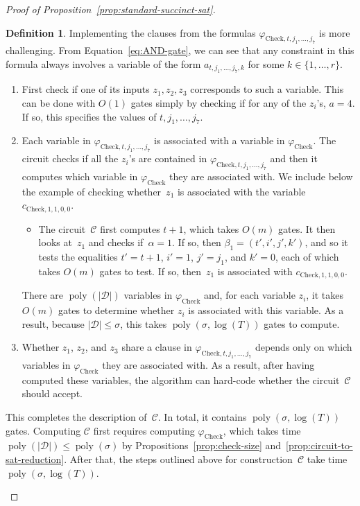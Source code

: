 \documentclass[11pt]{article}
\theoremstyle{definition}
\newtheorem{definition}[theorem]{Definition}
\DeclareMathOperator{\poly}{poly}
\newcommand{\decider}{\mathcal{D}}
\newcommand{\circuit}{\mathcal{C}}
\begin{document}
\begin{proof}[Proof of Proposition~\ref{prop:standard-succinct-sat}]
\begin{definition}
  Implementing the clauses from the formulas $\varphi_{\mathrm{Check}, t, j_1,
    \ldots, j_7}$ is more challenging.
  From Equation~\eqref{eq:AND-gate}, we can see that any constraint in this
  formula always involves a variable of the form $a_{t, j_1, \ldots, j_7, k}$
  for some $k \in \{1, \ldots, r\}$.
  \begin{enumerate}
  \item First check if one of its inputs $z_1, z_2, z_3$ corresponds to such a
    variable.
    This can be done with $O(1)$ gates simply by checking if for any of the
    $z_i$'s, $a = 4$.
    If so, this specifies the values of $t, j_1, \ldots, j_7$.
  \item Each variable in $\varphi_{\mathrm{Check}, t, j_1, \ldots, j_7}$ is
    associated with a variable in $\varphi_{\mathrm{Check}}$.
    The circuit checks if all the $z_i$'s are contained in
    $\varphi_{\mathrm{Check}, t, j_1, \ldots, j_7}$ and then it computes which
    variable in $\varphi_{\mathrm{Check}}$ they are associated with.
    We include below the example of checking whether~$z_1$ is associated with
    the variable $c_{\mathrm{Check},1, 1, 0, 0}$.
    \begin{itemize}
    \item The circuit~$\circuit$ first computes $t+1$, which takes $O(m)$ gates.
      It then looks at~$z_1$ and checks if~$\alpha=1$.
      If so, then $\beta_1 = (t', i', j', k')$, and so it tests the equalities
      $t' = t+1$, $i' = 1$, $j' = j_1$, and $k' = 0$, each of which takes $O(m)$
      gates to test.
      If so, then~$z_1$ is associated with $c_{\mathrm{Check},1, 1, 0, 0}$.
    \end{itemize}
    There are $\poly(|\decider|)$ variables in $\varphi_{\mathrm{Check}}$ and,
    for each variable $z_i$, it takes $O(m)$ gates to determine whether $z_i$ is
    associated with this variable.
    As a result, because $|\decider| \leq \sigma$, this takes $\poly(\sigma,
    \log(T))$ gates to compute.
  \item Whether $z_1$, $z_2$, and $z_3$ share a clause in
    $\varphi_{\mathrm{Check}, t, j_1, \ldots, j_7}$ depends only on which
    variables in $\varphi_{\mathrm{Check}}$ they are associated with.
    As a result, after having computed these variables, the algorithm can
    hard-code whether the circuit~$\circuit$ should accept.
  \end{enumerate}
  This completes the description of~$\circuit$.
  In total, it contains $\poly(\sigma, \log(T))$ gates.
  Computing $\circuit$ first requires computing $\varphi_{\mathrm{Check}}$,
  which takes time $\poly(|\decider|) \leq \poly(\sigma)$ by
  Propositions~\ref{prop:check-size} and~\ref{prop:circuit-to-sat-reduction}.
  After that, the steps outlined above for construction~$\circuit$ take
  time~$\poly(\sigma, \log(T))$.
\end{definition}


\end{proof}
\end{document}
